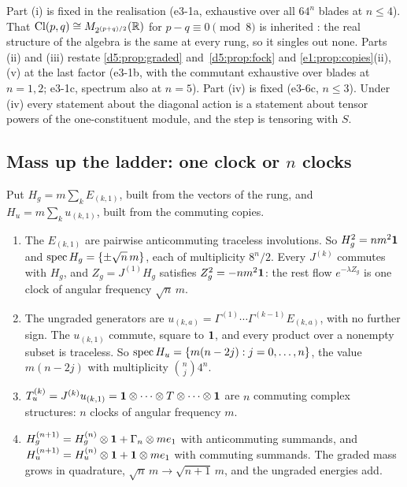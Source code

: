 Part (i) is fixed in the realisation (e3-1a, exhaustive over all $64^n$ blades at $n\le4$). That $\mathrm{Cl}(p,q)\cong M_{2^{(p+q)/2}}(\mathbb{R})$ for $p-q\equiv0\pmod8$
is inherited \cite{LawsonMichelsohn89}: the real structure of the algebra is the same at every rung, so it singles out none. Parts (ii) and
(iii) restate \cref{d5:prop:graded} and~\cref{d5:prop:fock} and \cref{e1:prop:copies}(ii),(v) at the last factor (e3-1b, with the commutant
exhaustive over blades at $n=1,2$; e3-1c, spectrum also at $n=5$). Part (iv) is fixed (e3-6c, $n\le3$). Under (iv) every statement about the
diagonal action is a statement about tensor powers of the one-constituent module, and the step is tensoring with $S$.

\subsection{Mass up the ladder: one clock or \texorpdfstring{$n$}{n} clocks}
\label{e3:sec:mass}

Put $H_g=m\sum_kE_{(k,1)}$, built from the vectors of the rung, and $H_u=m\sum_ku_{(k,1)}$, built from the commuting copies.

\begin{proposition}
\label{e3:prop:mass}
\begin{enumerate}[label=(\roman*),leftmargin=2.2em]
\item The $E_{(k,1)}$ are pairwise anticommuting traceless involutions. So $H_g^2=nm^2\mathbf 1$ and $\operatorname{spec} H_g=\{\pm\sqrt n\,m\}$, each of multiplicity
$8^n/2$. Every $J^{(k)}$ commutes with $H_g$, and $Z_g=J^{(1)}H_g$ satisfies $Z_g^2=-nm^2\mathbf 1$: the rest flow $e^{-\lambda Z_g}$ is one clock of
angular frequency $\sqrt n\,m$.
\item The ungraded generators are $u_{(k,a)}=\Gamma^{(1)}\cdots\Gamma^{(k-1)}E_{(k,a)}$, with no further sign. The $u_{(k,1)}$ commute, square to $\mathbf 1$, and
every product over a nonempty subset is traceless. So $\operatorname{spec} H_u=\{m(n-2j):j=0,\dots,n\}$, the value $m(n-2j)$ with multiplicity $\binom nj4^n$.
\item $T^{(k)}_u=J^{(k)}u_{(k,1)}=\mathbf 1\otimes\cdots\otimes T\otimes\cdots\otimes\mathbf 1$ are $n$ commuting complex structures: $n$ clocks of angular frequency $m$.
\item $H_g^{(n+1)}=H_g^{(n)}\otimes\mathbf 1+\Gamma_n\otimes me_1$ with anticommuting summands, and $H_u^{(n+1)}=H_u^{(n)}\otimes\mathbf 1+\mathbf 1\otimes me_1$ with commuting
summands. The graded mass grows in quadrature, $\sqrt n\,m\to\sqrt{n+1}\,m$, and the ungraded energies add.
\end{enumerate}
\end{proposition}

